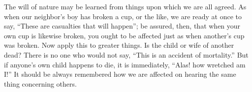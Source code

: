 The will of nature may be learned from  things upon which we are all agreed. As
when our neighbor's boy has broken a cup,  or the like, we are ready at once to
say, ``These  are casualties that  will happen'';  be assured, then,  that when
your  own cup  is  likewise broken,  you  ought  to be  affected  just as  when
another's cup  was broken. Now  apply this to greater  things. Is the  child or
wife of another dead? There is no one  who would not say, ``This is an accident
of mortality.''  But if anyone's own  child happens to die,  it is immediately,
``Alas! how wretched am I!'' It should be always remembered how we are affected
on hearing the same thing concerning others.
